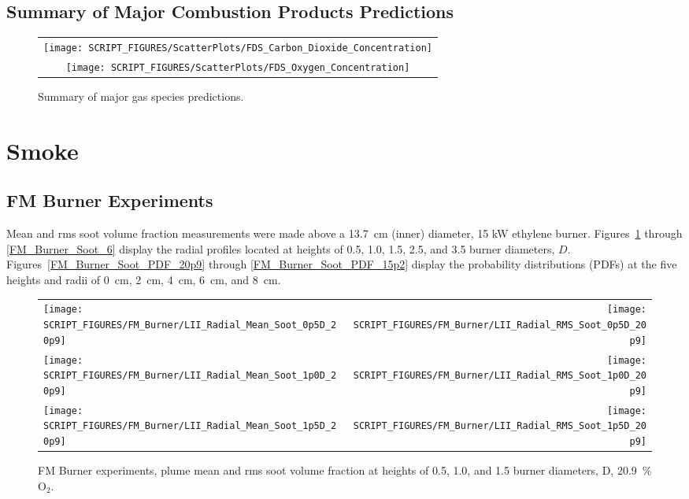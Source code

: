 \clearpage


\subsection{Summary of Major Combustion Products Predictions}
\label{Carbon Dioxide Concentration}
\label{Oxygen Concentration}


\begin{figure}[!h]
\centering
\begin{tabular}{c}
\texttt{[image: SCRIPT\_FIGURES/ScatterPlots/FDS\_Carbon\_Dioxide\_Concentration]} \\
\texttt{[image: SCRIPT\_FIGURES/ScatterPlots/FDS\_Oxygen\_Concentration]}
\end{tabular}
\caption[Summary of major gas species predictions]
{Summary of major gas species predictions.}
\end{figure}

\clearpage


\section{Smoke}

\subsection{FM Burner Experiments}
\label{FM_Burner_Soot}

Mean and rms soot volume fraction measurements were made above a 13.7~cm (inner) diameter, 15 kW ethylene burner. Figures~\ref{FM_Burner_Soot_1} through \ref{FM_Burner_Soot_6} display the radial profiles located at heights of 0.5, 1.0, 1.5, 2.5, and 3.5 burner diameters, $D$. Figures~\ref{FM_Burner_Soot_PDF_20p9} through \ref{FM_Burner_Soot_PDF_15p2} display the probability distributions (PDFs) at the five heights and radii of 0~cm, 2~cm, 4~cm, 6~cm, and 8~cm.

\begin{figure}[!h]
\begin{tabular*}{\textwidth}{l@{\extracolsep{\fill}}r}
\texttt{[image: SCRIPT\_FIGURES/FM\_Burner/LII\_Radial\_Mean\_Soot\_0p5D\_20p9]} &
\texttt{[image: SCRIPT\_FIGURES/FM\_Burner/LII\_Radial\_RMS\_Soot\_0p5D\_20p9]} \\
\texttt{[image: SCRIPT\_FIGURES/FM\_Burner/LII\_Radial\_Mean\_Soot\_1p0D\_20p9]} &
\texttt{[image: SCRIPT\_FIGURES/FM\_Burner/LII\_Radial\_RMS\_Soot\_1p0D\_20p9]} \\
\texttt{[image: SCRIPT\_FIGURES/FM\_Burner/LII\_Radial\_Mean\_Soot\_1p5D\_20p9]} &
\texttt{[image: SCRIPT\_FIGURES/FM\_Burner/LII\_Radial\_RMS\_Soot\_1p5D\_20p9]}
\end{tabular*}
\caption[FM Burner experiments, plume mean and rms soot volume fraction, 20.9~\% O$_2$]
{FM Burner experiments, plume mean and rms soot volume fraction at heights of 0.5, 1.0, and 1.5 burner diameters, D, 20.9~\% O$_2$.}
\label{FM_Burner_Soot_1}
\end{figure}

